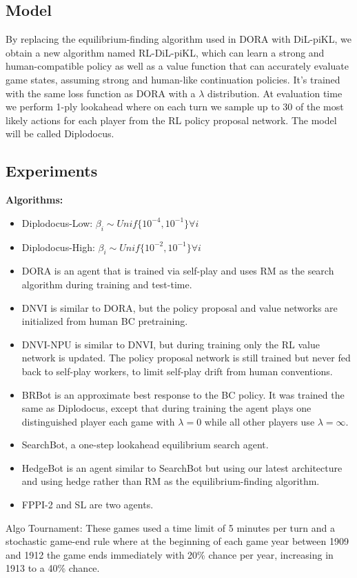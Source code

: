 \documentclass[12pt]{article}
\begin{document}
\subsection{Model}
By replacing the equilibrium-finding algorithm used in DORA with DiL-piKL, we obtain a new algorithm named RL-DiL-piKL, which can learn a strong and human-compatible policy as well as a value function that can accurately
evaluate game states, assuming strong and human-like continuation policies. It's trained with the same loss function as DORA with a $\lambda$ distribution. At evaluation time we perform 1-ply lookahead where on each turn we sample up to 30 of the most likely actions for each player from the RL policy proposal network. The model will be called Diplodocus.
\subsection{Experiments}
\textbf{Algorithms:}
\begin{itemize}
  \item Diplodocus-Low: $\beta_i\sim Unif\{10^{-4},10^{-1}\}\forall i$
  \item Diplodocus-High: $\beta_i\sim Unif\{10^{-2},10^{-1}\}\forall i$
  \item DORA is an agent that is trained via self-play and uses RM as the search algorithm during training
  and test-time.
  \item DNVI is similar to DORA, but the policy proposal and value networks are initialized from human
  BC pretraining.
  \item DNVI-NPU is similar to DNVI, but during training only the RL value network is updated. The policy proposal network is still trained but never fed back to self-play workers, to limit self-play drift from human conventions.
  \item BRBot is an approximate best response to the BC policy. It was trained the same as Diplodocus,
  except that during training the agent plays one distinguished player each game with $\lambda = 0$ while all
  other players use $\lambda = \infty$.
  \item SearchBot, a one-step lookahead equilibrium search agent.
  \item HedgeBot is an agent similar to SearchBot but using our latest architecture and
  using hedge rather than RM as the equilibrium-finding algorithm.
  \item FPPI-2 and SL are two agents.
\end{itemize}
Algo Tournament: These games used a time limit of 5 minutes per turn and a stochastic game-end rule where at the beginning of each game year between 1909 and 1912 the game ends immediately with 20\% chance per year, increasing in 1913 to a 40\% chance.
\end{document}
